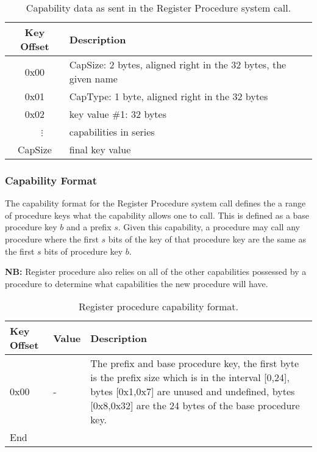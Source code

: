 \documentclass[english,a4paper]{article}
\let\oldparagraph\subsubsection
\renewcommand{\subsubsection}[1]{\oldparagraph{#1}\mbox{}}
\begin{document}
\begin{table}[H]
  \caption{Capability data as sent in the Register Procedure system call.\label{reg-cap-format}}
  \centering{}%
  \begin{tabularx}{\textwidth}{c|X}
    \hline
    Key Offset & Description \\
    \hline
    \hline
    0x00       & CapSize: 2 bytes, aligned right in the 32 bytes, the given
      name \\
    0x01       & CapType: 1 byte, aligned right in the 32 bytes \\
    0x02       & key value \#1: 32 bytes \\
    ~~~$\vdots$ & capabilities in series \\
    CapSize & final key value \\
    \hline
  \end{tabularx}
\end{table}

\subsubsection{Capability Format}
The capability format for the Register Procedure system call defines the a range
of procedure keys what the capability allows one to call. This is defined as a
base procedure key $b$ and a prefix $s$. Given this capability, a procedure may
call any procedure where the first $s$ bits of the key of that procedure key are
the same as the first $s$ bits of procedure key $b$.

\textbf{NB:} Register procedure also relies on all of the other capabilities
possessed by a procedure to determine what capabilities the new procedure will
have.

\begin{table}[H]
  \caption{Register procedure capability format.}
  \centering{}%
  \begin{tabular}{l|l|p{}}
    \hline
    Key Offset & Value & Description\tabularnewline
    \hline
    \hline
    0x00 & -    & The prefix and base procedure key, the first byte is the prefix
                 size which is in the interval [0,24], bytes [0x1,0x7] are
                 unused and undefined, bytes [0x8,0x32] are the 24 bytes of the
                 base procedure key. \tabularnewline
    \hline
    End &  \tabularnewline
    \hline
  \end{tabular}
\end{table}
\end{document}

